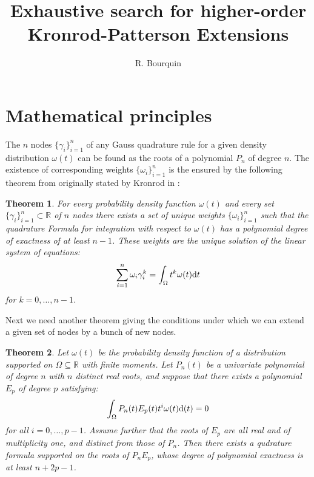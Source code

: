 \documentclass[a4paper,10pt]{article}
\title{Exhaustive search for higher-order Kronrod-Patterson Extensions}
\author{R. Bourquin}
\newtheorem{theorem}{Theorem}
\begin{document}
\maketitle


\section{Mathematical principles}

The $n$ nodes $\{\gamma_i\}_{i=1}^{n}$ of any Gauss quadrature rule for a
given density distribution $\omega(t)$ can be found as the roots of a
polynomial $P_n$ of degree $n$. The existence of corresponding weights
$\{\omega_i\}_{i=1}^{n}$ is the ensured by the following theorem from
\cite{mehrotra-papp} originally stated by Kronrod in \cite{kronrod}:

\begin{theorem}
  \label{th:existence_weights}
  For every probability density function $\omega(t)$ and every set
  $\{\gamma_i\}_{i=1}^{n} \subset \mathbb{R}$ of $n$ nodes there exists
  a set of unique weights $\{\omega_i\}_{i=1}^{n}$ such that the quadrature
  Formula for integration with respect to $\omega(t)$ has a polynomial
  degree of exactness of at least $n-1$. These weights are the unique solution
  of the linear system of equations:
  \begin{equation}
    \label{eq:linsys_for_weights}
    \sum_{i=1}^n \omega_i \gamma_i^k = \int_{\Omega} t^k \omega(t) \mathrm{d}t
  \end{equation}
  for $k = 0, \ldots, n-1$.
\end{theorem}

Next we need another theorem giving the conditions under which we can
extend a given set of nodes by a bunch of new nodes.

\begin{theorem}
  \label{th:defining_extension}
  Let $\omega(t)$ be the probability density function of a distribution
  supported on $\Omega \subseteq \mathbb{R}$ with finite moments. Let $P_n(t)$
  be a univariate polynomial of degree $n$ with $n$ distinct real roots,
  and suppose that there exists a polynomial $E_p$ of degree $p$ satisfying:
  \begin{equation}
    \label{eq:defining_extension}
    \int_\Omega P_n(t) E_p(t) t^i \omega(t) \mathrm{d}(t) = 0
  \end{equation}
  for all $i = 0, \ldots, p-1$. Assume further that the roots of $E_p$
  are all real and of multiplicity one, and distinct from
  those of $P_n$. Then there exists a qudrature formula supported on the
  roots of $P_n E_p$, whose degree of polynomial exactness is at least
  $n + 2p -1$.
\end{theorem}
\end{document}
